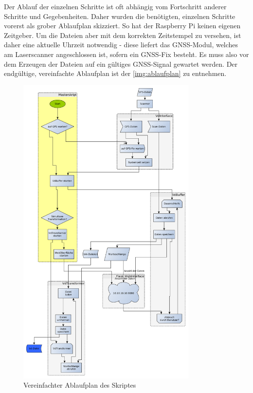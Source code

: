 \documentclass[a4paper,12pt,bibliography=totoc, listof=totoc,titlepage,pointlessnumbers]{scrreprt}
\begin{document}
Der Ablauf der einzelnen Schritte ist oft abhängig vom Fortschritt anderer Schritte und Gegebenheiten. Daher wurden die benötigten, einzelnen Schritte vorerst als grober Ablaufplan skizziert. So hat der Raspberry Pi keinen eigenen Zeitgeber. Um die Dateien aber mit dem korrekten Zeitstempel zu versehen, ist daher eine aktuelle Uhrzeit notwendig - diese liefert das GNSS-Modul, welches am Laserscanner angeschlossen ist, sofern ein GNSS-Fix besteht. Es muss also vor dem Erzeugen der Dateien auf ein gültiges GNSS-Signal gewartet werden. Der endgültige, vereinfachte Ablaufplan ist der \autoref{img:ablaufplan} zu entnehmen. 
\begin{figure}
 \centering
 \includegraphics[width=0.8\textwidth]{./img/Ablaufplan.png}
 \caption{Vereinfachter Ablaufplan des Skriptes}
 \label{img:ablaufplan}
\end{figure}
\end{document}
